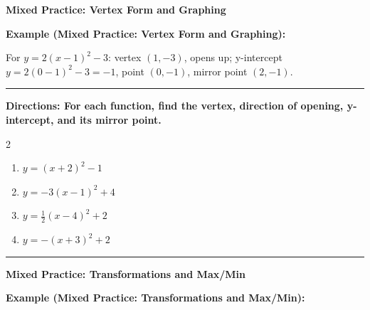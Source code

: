 \documentclass[12pt]{article}
\begin{document}
\vspace{0.35cm}

\begin{center}{\Large \textbf{Mixed Practice: Vertex Form and Graphing}}\end{center}\vspace{0.2cm}
\textbf{Example (Mixed Practice: Vertex Form and Graphing):}

For $y=2(x-1)^2-3$: vertex $(1,-3)$, opens up; y-intercept $y=2(0-1)^2-3=-1$, point $(0,-1)$, mirror point $(2,-1)$.

\vspace{0.2cm}\hrule\vspace{0.35cm}
\textbf{Directions: For each function, find the vertex, direction of opening, y-intercept, and its mirror point.}

\begin{multicols}{2}
\begin{enumerate}[label=\textbf{\arabic*.}, start=1, itemsep=2cm]
  \item $\displaystyle y=(x+2)^2-1$
  \item $\displaystyle y=-3(x-1)^2+4$
  \item $\displaystyle y=\frac{1}{2}(x-4)^2+2$
  \item $\displaystyle y=-(x+3)^2+2$
\end{enumerate}
\end{multicols}
\vspace{0.25cm}\hrule\vspace{0.35cm}

\begin{center}{\Large \textbf{Mixed Practice: Transformations and Max/Min}}\end{center}\vspace{0.2cm}
\textbf{Example (Mixed Practice: Transformations and Max/Min):}
\end{document}
